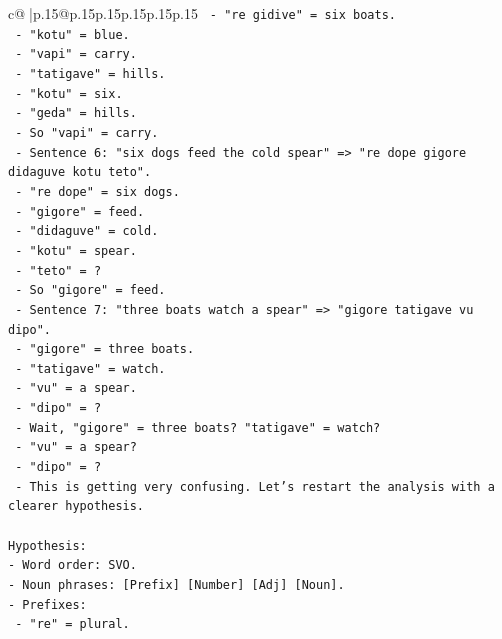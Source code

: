 \documentclass{article}
\begin{document}
{\begin{supertabular}{c@{$\;$}|p{.15\linewidth}@{}p{.15\linewidth}p{.15\linewidth}p{.15\linewidth}p{.15\linewidth}p{.15\linewidth}}
{{{\texttt{              {-} "re gidive" = six boats.} \\
\texttt{              {-} "kotu" = blue.} \\
\texttt{              {-} "vapi" = carry.} \\
\texttt{              {-} "tatigave" = hills.} \\
\texttt{              {-} "kotu" = six.} \\
\texttt{              {-} "geda" = hills.} \\
\texttt{              {-} So "vapi" = carry.} \\
\texttt{            {-} Sentence 6: "six dogs feed the cold spear" => "re dope gigore didaguve kotu teto".} \\
\texttt{              {-} "re dope" = six dogs.} \\
\texttt{              {-} "gigore" = feed.} \\
\texttt{              {-} "didaguve" = cold.} \\
\texttt{              {-} "kotu" = spear.} \\
\texttt{              {-} "teto" = ?} \\
\texttt{              {-} So "gigore" = feed.} \\
\texttt{            {-} Sentence 7: "three boats watch a spear" => "gigore tatigave vu dipo".} \\
\texttt{              {-} "gigore" = three boats.} \\
\texttt{              {-} "tatigave" = watch.} \\
\texttt{              {-} "vu" = a spear.} \\
\texttt{              {-} "dipo" = ?} \\
\texttt{              {-} Wait, "gigore" = three boats? "tatigave" = watch?} \\
\texttt{              {-} "vu" = a spear?} \\
\texttt{              {-} "dipo" = ?} \\
\texttt{              {-} This is getting very confusing. Let's restart the analysis with a clearer hypothesis.} \\
\\ 
\texttt{Hypothesis:} \\
\texttt{{-} Word order: SVO.} \\
\texttt{{-} Noun phrases: {[}Prefix{]} {[}Number{]} {[}Adj{]} {[}Noun{]}.} \\
\texttt{{-} Prefixes:} \\
\texttt{  {-} "re" = plural.} \\
}}}
\end{supertabular}}
\end{document}
